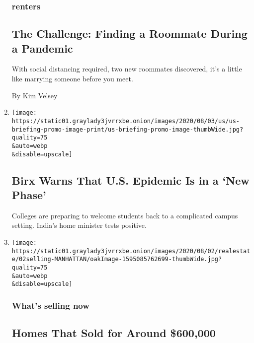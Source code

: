 \begin{enumerate}
  \hypertarget{renters}{%
  \subsubsection{renters}\label{renters}}

  \hypertarget{the-challenge-finding-a-roommate-during-a-pandemic}{%
  \subsection{The Challenge: Finding a Roommate During a
  Pandemic}\label{the-challenge-finding-a-roommate-during-a-pandemic}}

  With social distancing required, two new roommates discovered, it's a
  little like marrying someone before you meet.

  By Kim Velsey
\item
  \href{/2020/08/02/world/coronavirus-covid-19.html}{}

  \texttt{[image: https://static01.graylady3jvrrxbe.onion/images/2020/08/03/us/us-briefing-promo-image-print/us-briefing-promo-image-thumbWide.jpg?quality=75\\\&auto=webp\\\&disable=upscale]}

  \hypertarget{birx-warns-that-us-epidemic-is-in-a-new-phase}{%
  \subsection{Birx Warns That U.S. Epidemic Is in a `New
  Phase'}\label{birx-warns-that-us-epidemic-is-in-a-new-phase}}

  Colleges are preparing to welcome students back to a complicated
  campus setting. India's home minister tests positive.
\item
  \href{/2020/08/02/realestate/homes-that-sold-for-around-600000.html}{}

  \texttt{[image: https://static01.graylady3jvrrxbe.onion/images/2020/08/02/realestate/02selling-MANHATTAN/oakImage-1595085762699-thumbWide.jpg?quality=75\\\&auto=webp\\\&disable=upscale]}

  \hypertarget{whats-selling-now}{%
  \subsubsection{What's selling now}\label{whats-selling-now}}

  \hypertarget{homes-that-sold-for-around-600000}{%
  \subsection{Homes That Sold for Around
  \$600,000}\label{homes-that-sold-for-around-600000}}


\end{enumerate}
